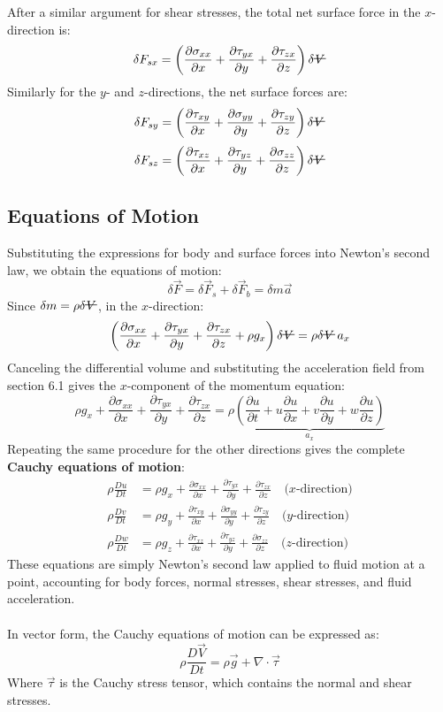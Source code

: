 ﻿\documentclass[12pt]{article}
\newcommand{\vol}{\mathord{\text{\ooalign{\hidewidth $V$\hidewidth\cr\kern-0.5pt\raisebox{0.8ex}{\rule[0pt]{1em}{0.5pt}}}}}}
\begin{document}
After a similar argument for shear stresses, the total net surface force in the $x$-direction is:
\[
\delta F_{sx}=\left(\frac{\partial\sigma_{xx}}{\partial x}+\frac{\partial\tau_{yx}}{\partial y}+\frac{\partial\tau_{zx}}{\partial z}\right)\delta\vol
\]
Similarly for the $y$- and $z$-directions, the net surface forces are:
\[
\delta F_{sy}=\left(\frac{\partial\tau_{xy}}{\partial x}+\frac{\partial\sigma_{yy}}{\partial y}+\frac{\partial\tau_{zy}}{\partial z}\right)\delta\vol
\]
\[
\delta F_{sz}=\left(\frac{\partial\tau_{xz}}{\partial x}+\frac{\partial\tau_{yz}}{\partial y}+\frac{\partial\sigma_{zz}}{\partial z}\right)\delta\vol
\]
\subsection*{Equations of Motion}
Substituting the expressions for body and surface forces into Newton's second law, we obtain the equations of motion:
\[
\delta\vec F=\delta\vec F_s+\delta\vec F_b=\delta m\vec a
\]
Since \(\delta m=\rho\delta\vol\), in the \(x\)-direction:
\[
\left(\frac{\partial\sigma_{xx}}{\partial x}+\frac{\partial\tau_{yx}}{\partial y}+\frac{\partial\tau_{zx}}{\partial z}+\rho g_x\right)\delta\vol=\rho\delta\vol\,a_x
\]
Canceling the differential volume and substituting the acceleration field from section 6.1 gives the \(x\)-component of the momentum equation:
\[
\rho g_x+\frac{\partial\sigma_{xx}}{\partial x}+\frac{\partial\tau_{yx}}{\partial y}+\frac{\partial\tau_{zx}}{\partial z}
=
\rho\underbrace{\left(\frac{\partial u}{\partial t}+u\frac{\partial u}{\partial x}+v\frac{\partial u}{\partial y}+w\frac{\partial u}{\partial z}\right)}_{a_x}
\]
Repeating the same procedure for the other directions gives the complete \textbf{Cauchy equations of motion}:
\[
\boxed{\begin{aligned}
\rho\frac{Du}{Dt}&=\rho g_x+\frac{\partial\sigma_{xx}}{\partial x}+\frac{\partial\tau_{yx}}{\partial y}+\frac{\partial\tau_{zx}}{\partial z}
\quad \text{($x$-direction)}\\[6pt]
\rho\frac{Dv}{Dt}&=\rho g_y+\frac{\partial\tau_{xy}}{\partial x}+\frac{\partial\sigma_{yy}}{\partial y}+\frac{\partial\tau_{zy}}{\partial z}
\quad \text{($y$-direction)}\\[6pt]
\rho\frac{Dw}{Dt}&=\rho g_z+\frac{\partial\tau_{xz}}{\partial x}+\frac{\partial\tau_{yz}}{\partial y}+\frac{\partial\sigma_{zz}}{\partial z}
\quad \text{($z$-direction)}
\end{aligned}}
\]
These equations are simply Newton's second law applied to fluid motion at a point, accounting for body forces, normal stresses, shear stresses, and fluid acceleration.\\\\
In vector form, the Cauchy equations of motion can be expressed as:
\[
\boxed{\rho\frac{D\vec V}{Dt}=\rho\vec g+\nabla\cdot\vec{\tau}}
\]
Where \(\vec{\tau}\) is the Cauchy stress tensor, which contains the normal and shear stresses. 
\end{document}
